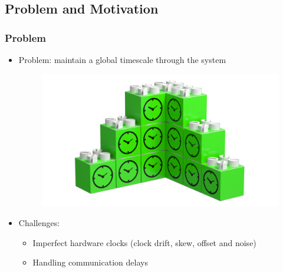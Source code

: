 \subsection{Problem and Motivation}

\begin{frame} \frametitle{Problem}
  \begin{itemize}
    \item Problem: maintain a global timescale through the system 
	\begin{figure}
	\centering
	\includegraphics[height=0.325\paperheight]{fig/synchronization/clock-bb-illustration.png}
	\end{figure}
    \item Challenges:
      \begin{itemize}
      \item Imperfect hardware clocks (clock drift, skew, offset and noise)
      \item Handling communication delays
      \end{itemize}
 \end{itemize}
\end{frame}


